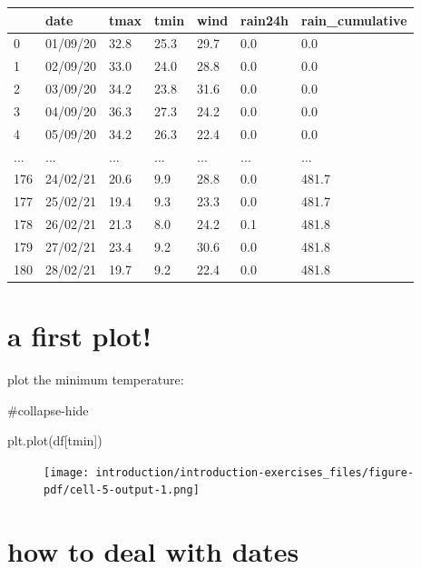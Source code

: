 \documentclass[
  letterpaper,
  DIV=11,
  numbers=noendperiod]{scrreprt}
\newenvironment{Shaded}{\begin{snugshade}}{\end{snugshade}}
\newcommand{\CommentTok}[1]{\textcolor[rgb]{0.37,0.37,0.37}{#1}}
\newcommand{\NormalTok}[1]{\textcolor[rgb]{0.00,0.23,0.31}{#1}}
\newcommand{\StringTok}[1]{\textcolor[rgb]{0.13,0.47,0.30}{#1}}
\begin{document}
\begin{longtable}[]{@{}lllllll@{}}
\toprule()
& date & tmax & tmin & wind & rain24h & rain\_cumulative \\
\midrule()
\endhead
0 & 01/09/20 & 32.8 & 25.3 & 29.7 & 0.0 & 0.0 \\
1 & 02/09/20 & 33.0 & 24.0 & 28.8 & 0.0 & 0.0 \\
2 & 03/09/20 & 34.2 & 23.8 & 31.6 & 0.0 & 0.0 \\
3 & 04/09/20 & 36.3 & 27.3 & 24.2 & 0.0 & 0.0 \\
4 & 05/09/20 & 34.2 & 26.3 & 22.4 & 0.0 & 0.0 \\
... & ... & ... & ... & ... & ... & ... \\
176 & 24/02/21 & 20.6 & 9.9 & 28.8 & 0.0 & 481.7 \\
177 & 25/02/21 & 19.4 & 9.3 & 23.3 & 0.0 & 481.7 \\
178 & 26/02/21 & 21.3 & 8.0 & 24.2 & 0.1 & 481.8 \\
179 & 27/02/21 & 23.4 & 9.2 & 30.6 & 0.0 & 481.8 \\
180 & 28/02/21 & 19.7 & 9.2 & 22.4 & 0.0 & 481.8 \\
\bottomrule()
\end{longtable}

\hypertarget{a-first-plot}{%
\section{a first plot!}\label{a-first-plot}}

plot the minimum temperature:

\begin{Shaded}
\begin{Highlighting}[]
\CommentTok{\#collapse{-}hide}

\NormalTok{plt.plot(df[}\StringTok{\textquotesingle{}tmin\textquotesingle{}}\NormalTok{])}
\end{Highlighting}
\end{Shaded}

\begin{figure}[H]

{\centering \texttt{[image: introduction/introduction-exercises\_files/figure-pdf/cell-5-output-1.png]}

}

\end{figure}

\hypertarget{how-to-deal-with-dates}{%
\section{how to deal with dates}\label{how-to-deal-with-dates}}
\end{document}
